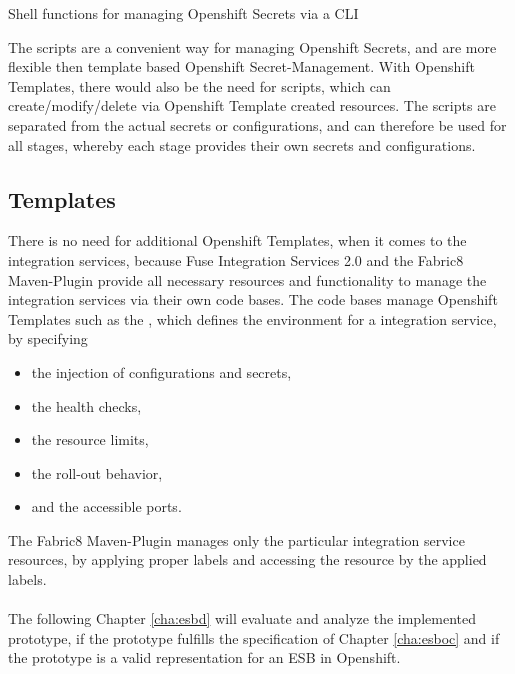 \begin{listing}[h]
	\caption{Shell functions for managing Openshift Secrets via a CLI}
	\label{ls:esboi-openshift-oc-service}
\end{listing}

The scripts are a convenient way for managing Openshift Secrets, and are more flexible then template based Openshift Secret-Management. With Openshift Templates, there would also be the need for scripts, which can create/modify/delete via Openshift Template created resources. The scripts are separated from the actual secrets or configurations, and can therefore be used for all stages, whereby each stage provides their own secrets and configurations. 

\subsection{Templates}
\label{sec:esbi-openshift-config}
There is no need for additional Openshift Templates, when it comes to the integration services, because Fuse Integration Services 2.0 and the Fabric8 Maven-Plugin provide all necessary resources and functionality to manage the integration services via their own code bases. The code bases manage Openshift Templates such as the , which defines the environment for a integration service, by specifying
\begin{itemize}
	\item the injection of configurations and secrets,
	\item the health checks,
	\item the resource limits,
	\item the roll-out behavior,
	\item and the accessible ports.
\end{itemize}

The Fabric8 Maven-Plugin manages only the particular integration service resources, by applying proper labels and accessing the resource by the applied labels.
\\ \\
The following Chapter \vref{cha:esbd} will evaluate and analyze the implemented prototype, if the prototype fulfills the specification of Chapter \vref{cha:esboc} and if the prototype is a valid representation for an ESB in Openshift.



